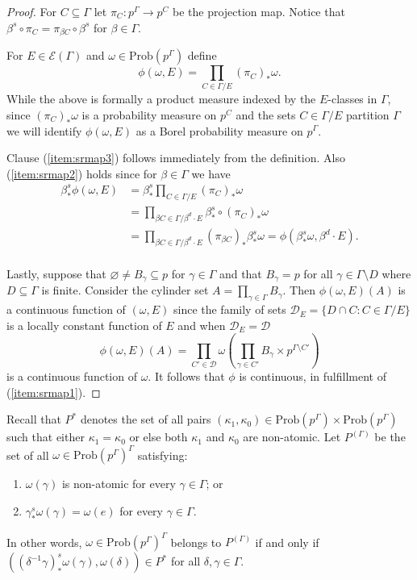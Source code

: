 \documentclass[12pt]{amsart}
\theoremstyle{definition}
\def\cal{\mathcal}
\newcommand{\Prob}{\mathrm{Prob}}
\begin{document}
\begin{proof}
	For $C \subseteq \Gamma$ let $\pi_C : p^\Gamma \rightarrow p^C$ be the projection map. Notice that $\beta^s \circ \pi_C = \pi_{\beta C} \circ \beta^s$ for $\beta \in \Gamma$.
	
	For $E \in \cal E(\Gamma)$ and $\omega \in \Prob(p^\Gamma)$ define
	\[\phi(\omega, E) = \prod_{C \in \Gamma / E} (\pi_C)_* \omega.\]
	While the above is formally a product measure indexed by the $E$-classes in $\Gamma$, since $(\pi_C)_* \omega$ is a probability measure on $p^C$ and the sets $C \in \Gamma / E$ partition $\Gamma$ we will identify $\phi(\omega, E)$ as a Borel probability measure on $p^\Gamma$.
	
	Clause (\ref{item:srmap3}) follows immediately from the definition. Also (\ref{item:srmap2}) holds since for $\beta \in \Gamma$ we have
	\begin{align*}
		\beta^s_* \phi(\omega, E) & = \beta^s_* \prod_{C \in \Gamma / E} (\pi_C)_* \omega\\
		& = \prod_{\beta C \in \Gamma / \beta^d \cdot E} \beta^s_* \circ (\pi_C)_* \omega\\
		& = \prod_{\beta C \in \Gamma / \beta^d \cdot E} (\pi_{\beta C})_* \beta^s_* \omega = \phi(\beta^s_* \omega, \beta^d \cdot E).\\
	\end{align*}
	
	Lastly, suppose that $\varnothing \neq B_\gamma \subseteq p$ for $\gamma \in \Gamma$ and that $B_\gamma = p$ for all $\gamma \in \Gamma \setminus D$ where $D \subseteq \Gamma$ is finite. Consider the cylinder set $A = \prod_{\gamma \in \Gamma} B_\gamma$. Then $\phi(\omega, E)(A)$ is a continuous function of $(\omega, E)$ since the family of sets $\cal D_E = \{D \cap C : C \in \Gamma / E\}$ is a locally constant function of $E$ and when $\cal D_E = \cal D$
	\[\phi(\omega, E)(A) = \prod_{C' \in \cal D} \omega \left( \prod_{\gamma \in C'} B_\gamma \times p^{\Gamma \setminus C'} \right)\]
	is a continuous function of $\omega$. It follows that $\phi$ is continuous, in fulfillment of (\ref{item:srmap1}).
\end{proof}

Recall that $P^*$ denotes the set of all pairs $(\kappa_1, \kappa_0) \in \Prob(p^\Gamma) \times \Prob(p^\Gamma)$ such that either $\kappa_1 = \kappa_0$ or else both $\kappa_1$ and $\kappa_0$ are non-atomic. Let $P^{(\Gamma)}$ be the set of all $\omega \in \Prob(p^\Gamma)^\Gamma$ satisfying:
\begin{enumerate}
	\item $\omega(\gamma)$ is non-atomic for every $\gamma \in \Gamma$; or
	\item $\gamma^s_* \omega(\gamma) = \omega(e)$ for every $\gamma \in \Gamma$.
\end{enumerate}
In other words, $\omega \in \Prob(p^\Gamma)^\Gamma$ belongs to $P^{(\Gamma)}$ if and only if $((\delta^{-1} \gamma)^s_* \omega(\gamma), \omega(\delta)) \in P^*$ for all $\delta, \gamma \in \Gamma$.
\end{document}
